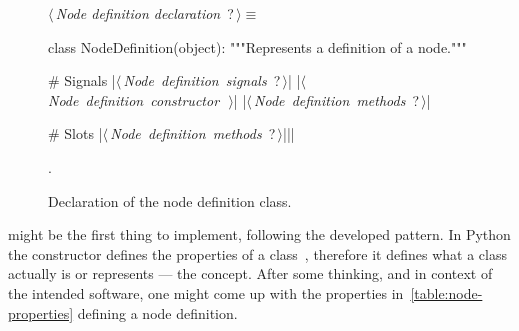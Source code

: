 \documentclass[%
    a4paper,    %
    justified,  %
    nobib,      %
    openany     %
]{tufte-book}
\begin{document}
\begin{figure}[h]
  \begin{flushleft} \small
\begin{minipage}{\linewidth}\label{scrap1}\raggedright\small
{} $\langle\,${\itshape Node definition declaration}\nobreak\ {\footnotesize {?}}$\,\rangle\equiv$
\vspace{-1ex}
\begin{pythoncode}
class NodeDefinition(object):
    """Represents a definition of a node."""

    # Signals
    |\hbox{$\langle\,${\itshape Node definition signals}\nobreak\ {\footnotesize ?}$\,\rangle$}|
    |\hbox{$\langle\,${\itshape Node definition constructor}\nobreak\ {\footnotesize {}}$\,\rangle$}|
    |\hbox{$\langle\,${\itshape Node definition methods}\nobreak\ {\footnotesize ?}$\,\rangle$}|

    # Slots
    |\hbox{$\langle\,${\itshape Node definition methods}\nobreak\ {\footnotesize ?}$\,\rangle$}||\NWsep|
\end{pythoncode}
\vspace{1.5ex}
\footnotesize
\begin{list}{}{\setlength{\itemsep}{-\parsep}\setlength{\itemindent}{-\leftmargin}}
\item {\NWtxtMacroNoRef}.

\item{}
\end{list}
\end{minipage}\vspace{4ex}
\end{flushleft}
\caption{Declaration of the node definition class.}
  \label{lst:node-def-class-decl}
\end{figure}

\vspace*{-2\baselineskip}
 might be the first thing to implement, following
the developed pattern. In Python the constructor defines the properties of a
class~, therefore it defines what a class
actually is or represents --- the concept. After some thinking, and in context
of the intended software, one might come up with the properties
in~\autoref{table:node-properties} defining a node definition.
\end{document}
